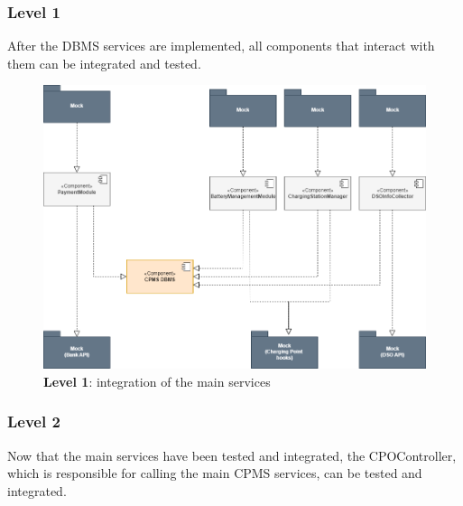 \documentclass[12pt]{report}
\begin{document}
\subsubsection{Level 1}
After the DBMS services are implemented, all components that interact with them can be integrated and tested.

\bigskip
\begin{figure}[ht]
    \centering
    \includegraphics[width=\textwidth]{assets/level1_CPMS_integration.png}
    \caption{\textbf{Level 1}: integration of the main services}
    \label{fig:my_label423666331333}
\end{figure}
\clearpage

\subsubsection{Level 2}
Now that the main services have been tested and integrated, the CPOController, which is responsible for calling the main CPMS services, can be tested and integrated.
\end{document}
